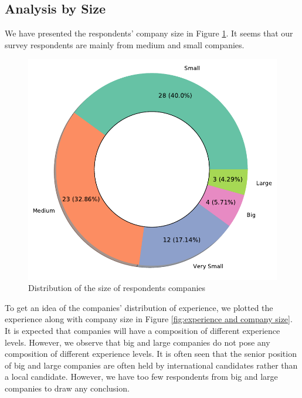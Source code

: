 \subsection{Analysis by Size}
\label{analysis by size}
We have presented the respondents' company size in Figure \ref{fig:company size}. It seems that our survey respondents are mainly from medium and small companies.

\begin{figure}[h]
\centering
  \includegraphics[scale=0.45]{Figures/Company_Size}
  \caption{Distribution of the size of respondents companies}
  \label{fig:company size}
\end{figure}

To get an idea of the companies' distribution of experience, we plotted the experience along with company size in Figure \ref{fig:experience and company size}. It is expected that companies will have a composition of different experience levels. However, we observe that big and large companies do not pose any composition of different experience levels. It is often seen that the senior position of big and large companies are often held by international candidates rather than a local candidate. However, we have too few respondents from big and large companies to draw any conclusion.

